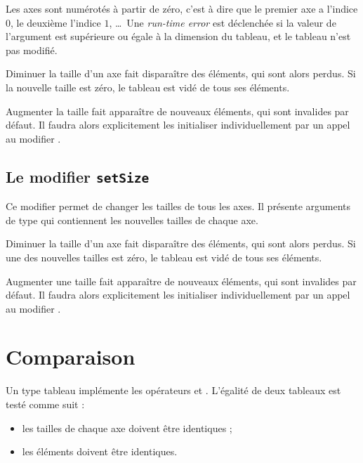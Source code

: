 Les axes sont numérotés à partir de zéro, c'est à dire que le premier axe a l'indice $0$, le deuxième l'indice $1$, \dots~Une \emph{run-time error} est déclenchée si la valeur de l'argument est supérieure ou égale à la dimension du tableau, et le tableau n'est pas modifié.
 
Diminuer la taille d'un axe fait disparaître des éléments, qui sont alors perdus. Si la nouvelle taille est zéro, le tableau est vidé de tous ses éléments.

Augmenter la taille fait apparaître de nouveaux éléments, qui sont invalides par défaut. Il faudra alors explicitement les initialiser individuellement par un appel au modifier .




\subsection{Le modifier \texttt{setSize}}

Ce modifier permet de changer les tailles de tous les axes. Il présente  arguments de type  qui contiennent les nouvelles tailles de chaque axe.

Diminuer la taille d'un axe fait disparaître des éléments, qui sont alors perdus. Si une des nouvelles tailles est zéro, le tableau est vidé de tous ses éléments.

Augmenter une taille fait apparaître de nouveaux éléments, qui sont invalides par défaut. Il faudra alors explicitement les initialiser individuellement par un appel au modifier .


\section{Comparaison}

Un type tableau implémente les opérateurs \galgas{=} et \galgas{\!=}. L'égalité de deux tableaux est testé comme suit :
\begin{itemize}
  \item les tailles de chaque axe doivent être identiques ;
  \item les éléments doivent être identiques.
\end {itemize}

